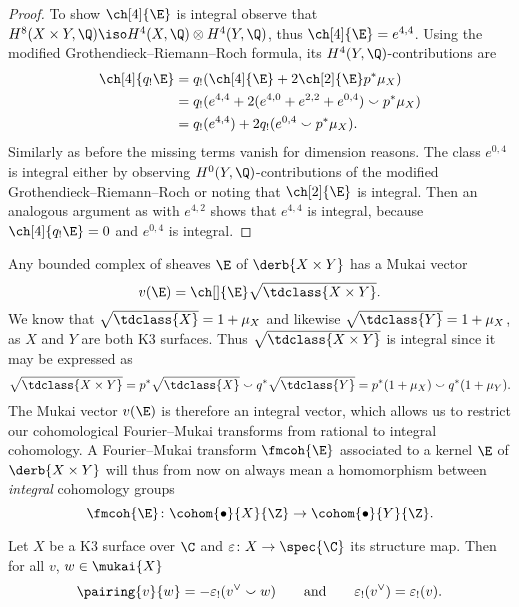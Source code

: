 \begin{proof}
    To show $\ch[4]{\E}$ is integral observe that $H^8(X \times Y, \Q) \iso H^4(X, \Q) \otimes H^4(Y, \Q)$, thus $\ch[4]{\E} = e^{4,4}$. Using the modified Grothendieck--Riemann--Roch formula, its $H^4(Y, \Q)$-contributions are
    \begin{align*}
        \ch[4]{q_!\E} &= q_!(\ch[4]{\E} + 2\ch[2]{\E}p^*\mu_X) \\
        &= q_!(e^{4,4} + 2(e^{4,0} + e^{2,2} + e^{0,4})\smallsmile p^*\mu_X) \\
        &= q_!(e^{4,4}) + 2q_!(e^{0,4} \smallsmile p^*\mu_X).
    \end{align*}
    Similarly as before the missing terms vanish for dimension reasons. The class $e^{0,4}$ is integral either by observing $H^0(Y, \Q)$-contributions of the modified Grothendieck--Riemann--Roch or noting that $\ch[2]{\E}$ is integral. Then an analogous argument as with $e^{4,2}$ shows that $e^{4,4}$ is integral, because $\ch[4]{q_!\E} = 0$ and $e^{0,4}$ is integral. 
\end{proof}

\begin{remark}
    \label{Remark for rational to integral fm restriction}
    Any bounded complex of sheaves $\E$ of $\derb{X \times Y}$ has a Mukai vector
    \[
        v(\E) = \ch[]{\E}\sqrt{\tdclass{X \times Y}}.
    \]
    We know that $\sqrt{\tdclass{X}} = 1 + \mu_X$ and likewise $\sqrt{\tdclass{Y}} = 1 + \mu_X$, as $X$ and $Y$ are both K3 surfaces. Thus $\sqrt{\tdclass{X \times Y}}$ is integral since it may be expressed as
    \[
        \sqrt{\tdclass{X \times Y}} = p^*\sqrt{\tdclass{X}} \smallsmile q^*\sqrt{\tdclass{Y}} = p^*(1 + \mu_X) \smallsmile q^*(1 + \mu_Y).
    \]
    The Mukai vector $v(\E)$ is therefore an integral vector, which allows us to restrict our cohomological Fourier--Mukai transforms from rational to integral cohomology. A Fourier--Mukai transform $\fmcoh{\E}$ associated to a kernel $\E$ of $\derb{X \times Y}$ will thus from now on always mean a homomorphism between \emph{integral} cohomology groups
    \[
        \fmcoh{\E} \colon \cohom{\bullet}{X}{\Z} \to \cohom{\bullet}{Y}{\Z}.
    \] 
\end{remark}

\begin{lemma}
    \label{Intersection pairing through push-forward of structure map}
    Let $X$ be a K3 surface over $\C$ and $\varepsilon \colon X \to \spec{\C}$ its structure map. Then for all $v$, $w \in \mukai{X}$
    \[
        \pairing{v}{w} = - \varepsilon_!(v^\vee \smallsmile w) \qquad \text{and} \qquad \varepsilon_!(v^\vee) = \varepsilon_!(v). 
    \] 
\end{lemma}


